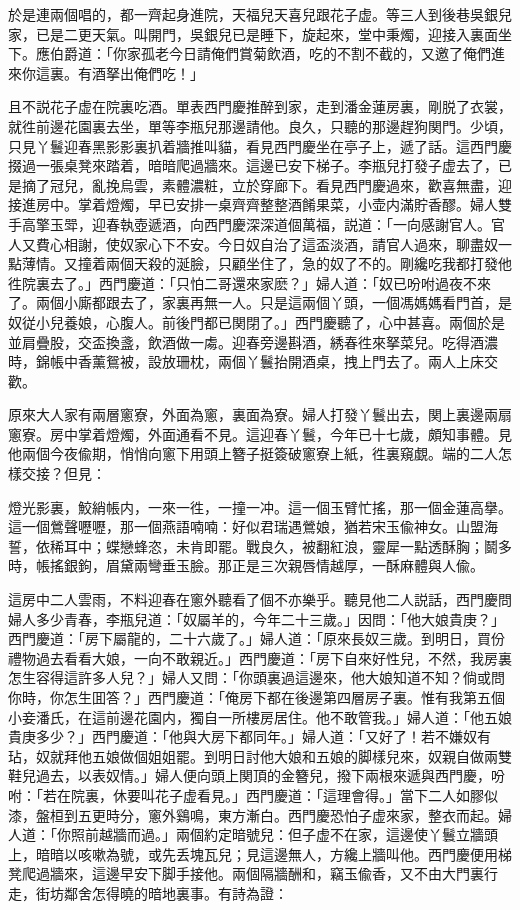 於是連兩個唱的，都一齊起身進院，天福兒天喜兒跟花子虚。等三人到後巷吳銀兒家，已是二更天氣。叫開門，吳銀兒已是睡下，旋起來，堂中秉燭，迎接入裏面坐下。應伯爵道：「你家孤老今日請俺們賞菊飲酒，吃的不割不截的，又邀了俺們進來你這裏。有酒拏出俺們吃！」

且不説花子虚在院裏吃酒。單表西門慶推醉到家，走到潘金蓮房裏，剛脱了衣裳，就徃前邊花園裏去坐，單等李瓶兒那邊請他。良久，只聽的那邊趕狗関門。少頃，只見丫鬟迎春黑影影裏扒着牆推叫貓，看見西門慶坐在亭子上，遞了話。這西門慶掇過一張桌凳來踏着，暗暗爬過牆來。這邊已安下梯子。李瓶兒打發子虚去了，已是摘了冠兒，亂挽烏雲，素體濃粧，立於穿廊下。看見西門慶過來，歡喜無盡，迎接進房中。掌着燈燭，早已安排一桌齊齊整整酒餚果菜，小壶内滿貯香醪。婦人雙手高擎玉斝，迎春執壺遞酒，向西門慶深深道個萬福，説道：「一向感謝官人。官人又費心相謝，使奴家心下不安。今日奴自治了這盃淡酒，請官人過來，聊盡奴一點薄情。又撞着兩個天殺的涎臉，只顧坐住了，急的奴了不的。剛纔吃我都打發他徃院裏去了。」西門慶道：「只怕二哥還來家麽？」婦人道：「奴已吩咐過夜不來了。兩個小廝都跟去了，家裏再無一人。只是這兩個丫頭，一個馮媽媽看門首，是奴従小兒養娘，心腹人。前後門都已関閉了。」西門慶聽了，心中甚喜。兩個於是並肩疊股，交盃換盞，飲酒做一䖏。迎春旁邊斟酒，綉春徃來拏菜兒。吃得酒濃時，錦帳中香薰鴛被，設放珊枕，兩個丫鬟抬開酒桌，拽上門去了。兩人上床交歡。

原來大人家有兩層窻寮，外面為窻，裏面為寮。婦人打發丫鬟出去，関上裏邊兩扇窻寮。房中掌着燈燭，外面通看不見。這迎春丫鬟，今年已十七歲，頗知事體。見他兩個今夜偸期，悄悄向窻下用頭上簪子挺簽破窻寮上紙，徃裏窺覷。端的二人怎樣交接？但見：

\begin{myquote}
燈光影裏，鮫綃帳内，一來一徃，一撞一冲。這一個玉臂忙搖，那一個金蓮高擧。這一個鶯聲嚦嚦，那一個燕語喃喃：好似君瑞遇鶯娘，猶若宋玉偸神女。山盟海誓，依稀耳中；蝶戀蜂恣，未肯即罷。戰良久，被翻紅浪，靈犀一點透酥胸；鬬多時，帳搖銀鉤，眉黛兩彎垂玉臉。那正是三次親唇情越厚，一酥麻體與人偸。
\end{myquote}

這房中二人雲雨，不料迎春在窻外聽看了個不亦樂乎。聽見他二人説話，西門慶問婦人多少青春，李瓶兒道：「奴屬羊的，今年二十三歲。」因問：「他大娘貴庚？」西門慶道：「房下屬龍的，二十六歲了。」婦人道：「原來長奴三歲。到明日，買份禮物過去看看大娘，一向不敢親近。」西門慶道：「房下自來好性兒，不然，我房裏怎生容得這許多人兒？」婦人又問：「你頭裏過這邊來，他大娘知道不知？倘或問你時，你怎生囬答？」西門慶道：「俺房下都在後邊第四層房子裏。惟有我第五個小妾潘氏，在這前邊花園内，獨自一所樓房居住。他不敢管我。」婦人道：「他五娘貴庚多少？」西門慶道：「他與大房下都同年。」婦人道：「又好了！若不嫌奴有玷，奴就拜他五娘做個姐姐罷。到明日討他大娘和五娘的脚樣兒來，奴親自做兩雙鞋兒過去，以表奴情。」婦人便向頭上関頂的金簪兒，撥下兩根來遞與西門慶，吩咐：「若在院裏，休要叫花子虚看見。」西門慶道：「這理會得。」當下二人如膠似漆，盤桓到五更時分，窻外鷄鳴，東方漸白。西門慶恐怕子虚來家，整衣而起。婦人道：「你照前越牆而過。」兩個約定暗號兒：但子虚不在家，這邊使丫鬟立牆頭上，暗暗以咳嗽為號，或先丢塊瓦兒；見這邊無人，方纔上牆叫他。西門慶便用梯凳爬過牆來，這邊早安下脚手接他。兩個隔牆酬和，竊玉偸香，又不由大門裏行走，街坊鄰舍怎得曉的暗地裏事。有詩為證：

